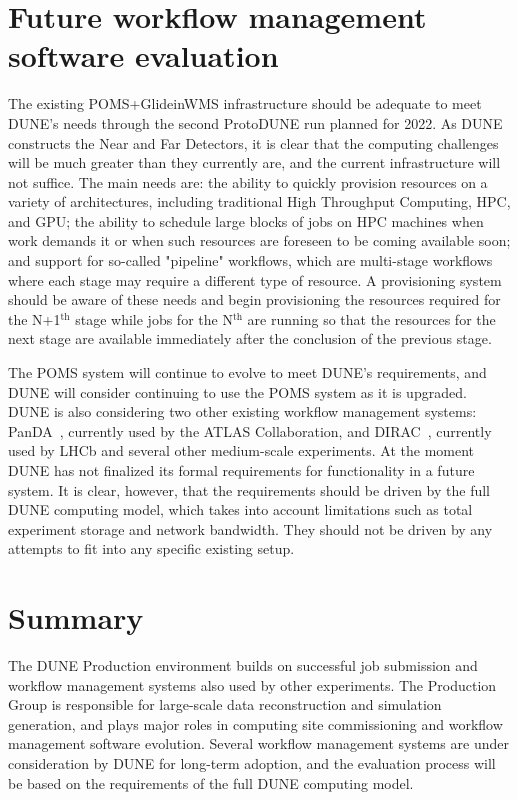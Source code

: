 \documentclass{webofc}
\begin{document}
\section{Future workflow management software evaluation}
\label{sec:future}
The existing POMS+GlideinWMS infrastructure should be adequate to meet DUNE's needs through the second ProtoDUNE
run planned for 2022. As DUNE constructs the Near and Far Detectors, it is clear that the computing challenges will
be much greater than they currently are, and the current infrastructure will not suffice. The main needs are: the ability to quickly provision resources
on a variety of architectures, including traditional High Throughput Computing, HPC, and GPU; the ability to schedule large blocks of jobs on HPC machines when work demands it or when such resources are 
foreseen to be coming available soon; and support for so-called "pipeline" workflows, which are multi-stage workflows where each stage may require a different type of resource. A provisioning system should
be aware of these needs and begin provisioning the resources required for the N+1$^{\textrm{th}}$ stage while jobs for the N$^{\textrm{th}}$ are running so that the resources for the next stage are available immediately after the conclusion of the previous stage. 

The POMS system will continue to evolve to meet DUNE's requirements, and DUNE will consider continuing to use the POMS
system as it is upgraded. DUNE is also considering two other existing workflow management systems: PanDA~\cite{panda}, currently
used by the ATLAS Collaboration, and DIRAC~\cite{dirac}, currently used by LHCb and several other medium-scale experiments. At the moment
DUNE has not finalized its formal requirements for functionality in a future system. It is clear, however, that the requirements should be driven by
the full DUNE computing model, which takes into account limitations such as total experiment storage and network bandwidth. They should not be driven by
any attempts to fit into any specific existing setup.

\section{Summary}
\label{sec:sum}
The DUNE Production environment builds on successful job submission and workflow management systems also used by other experiments.  The Production Group is responsible
for large-scale data reconstruction and simulation generation, and plays major roles in computing site commissioning and workflow management software evolution. Several workflow management
systems are under consideration by DUNE for long-term adoption, and the evaluation process will be based on the requirements of the full DUNE computing model. 
\end{document}
